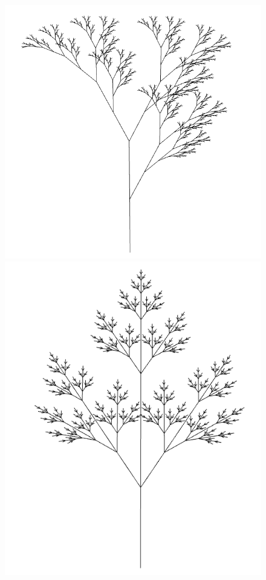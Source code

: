 \documentclass[a4paper,10pt]{report}
\begin{document}
\begin{figure}[h!]
\centering
\begin{minipage}{.3\textwidth}
  \centering
  \includegraphics[width=.9\linewidth]{tree1.png}
    \end{minipage}%
\begin{minipage}{.3\textwidth}
  \centering
  \includegraphics[width=.9\linewidth]{tree2.png}

\end{minipage}
\end{figure}
\end{document}
